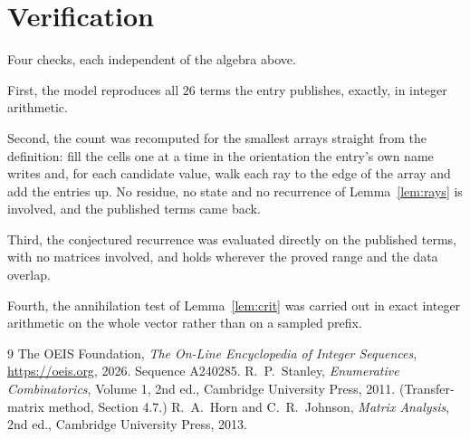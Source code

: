 \documentclass[11pt,a4paper]{article}
\theoremstyle{plain}
\theoremstyle{definition}
\begin{document}
\section{Verification}

Four checks, each independent of the algebra above.

First, the model reproduces all $26$ terms the entry publishes, exactly, in integer
arithmetic.

Second, the count was recomputed for the smallest arrays straight from the definition: fill the
cells one at a time in the orientation the entry's own name writes and, for each candidate
value, walk each ray to the edge of the array and add the entries up. No residue, no state and
no recurrence of Lemma~\ref{lem:rays} is involved, and the published terms came back.

Third, the conjectured recurrence was evaluated directly on the published terms, with no
matrices involved, and holds wherever the proved range and the data overlap.

Fourth, the annihilation test of Lemma~\ref{lem:crit} was carried out in exact integer
arithmetic on the whole vector rather than on a sampled prefix.

\begin{thebibliography}{9}
 The OEIS Foundation, \emph{The On-Line Encyclopedia of Integer
Sequences}, \url{https://oeis.org}, 2026. Sequence A240285.
 R.~P.~Stanley, \emph{Enumerative Combinatorics}, Volume 1, 2nd ed.,
Cambridge University Press, 2011. (Transfer-matrix method, Section 4.7.)
 R.~A.~Horn and C.~R.~Johnson, \emph{Matrix Analysis}, 2nd ed., Cambridge
University Press, 2013.
\end{thebibliography}
\end{document}

